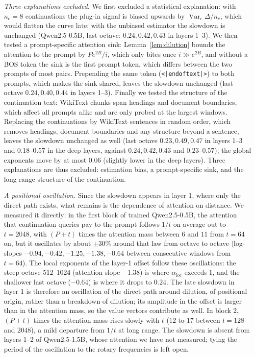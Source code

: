 \documentclass[11pt]{article}
\theoremstyle{definition}
\theoremstyle{remark}
\begin{document}
\emph{Three explanations excluded.} We first excluded a statistical explanation: with $n_c=8$ continuations the plug-in signal is biased upwards by $\operatorname{Var}_c\Delta/n_c$, which would flatten the curve late; with the unbiased estimator the slowdown is unchanged (Qwen2.5-0.5B, last octave: $0.24, 0.42, 0.43$ in layers 1--3). We then tested a prompt-specific attention sink: Lemma~\ref{lem:dilution} bounds the attention to the prompt by $Pe^{2B}/i$, which only bites once $i\gg e^{2B}$, and without a BOS token the sink is the first prompt token, which differs between the two prompts of most pairs. Prepending the same token (\texttt{<|endoftext|>}) to both prompts, which makes the sink shared, leaves the slowdown unchanged (last octave $0.24, 0.40, 0.44$ in layers 1--3). Finally we tested the structure of the continuation text: WikiText chunks span headings and document boundaries, which affect all prompts alike and are only probed at the largest windows. Replacing the continuations by WikiText sentences in random order, which removes headings, document boundaries and any structure beyond a sentence, leaves the slowdown unchanged as well (last octave $0.23, 0.49, 0.47$ in layers 1--3 and $0.18$--$0.57$ in the deep layers, against $0.24, 0.42, 0.43$ and $0.23$--$0.57$); the global exponents move by at most $0.06$ (slightly lower in the deep layers). Three explanations are thus excluded: estimation bias, a prompt-specific sink, and the long-range structure of the continuation.

\emph{A positional oscillation.} Since the slowdown appears in layer 1, where only the direct path exists, what remains is the dependence of attention on distance. We measured it directly: in the first block of trained Qwen2.5-0.5B, the attention that continuation queries pay to the prompt follows $1/t$ on average out to $t=2048$, with $(P+t)$ times the attention mass between $6$ and $11$ from $t=64$ on, but it oscillates by about $\pm30\%$ around that law from octave to octave (log-slopes $-0.94,-0.42,-1.25,-1.38,-0.64$ between consecutive windows from $t=64$). The local exponents of the layer-1 offset follow these oscillations: the steep octave $512$--$1024$ (attention slope $-1.38$) is where $\alpha_{\mathrm{loc}}$ exceeds $1$, and the shallower last octave ($-0.64$) is where it drops to $0.24$. The late slowdown in layer 1 is therefore an oscillation of the direct path around dilution, of positional origin, rather than a breakdown of dilution; its amplitude in the offset is larger than in the attention mass, so the value vectors contribute as well. In block 2, $(P+t)$ times the attention mass rises slowly with $t$ ($12$ to $17$ between $t=128$ and $2048$), a mild departure from $1/t$ at long range. The slowdown is absent from layers 1--2 of Qwen2.5-1.5B, whose attention we have not measured; tying the period of the oscillation to the rotary frequencies is left open.
\end{document}
